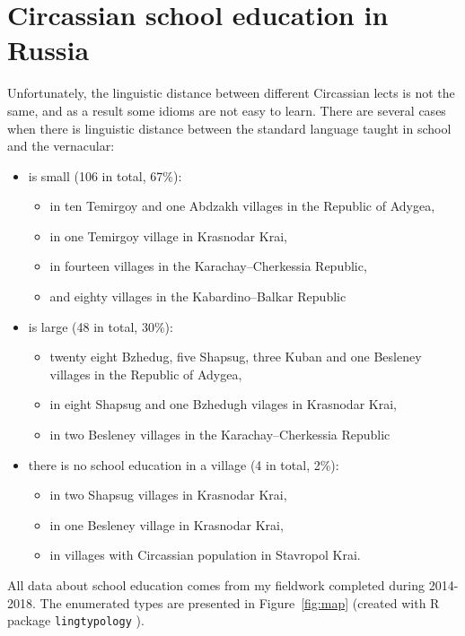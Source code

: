 \section{Circassian school education in Russia}
Unfortunately, the linguistic distance between different Circassian lects is not the same, and as a result some idioms are not easy to learn. There are several cases when there is linguistic distance between the standard language taught in school and the vernacular:

\begin{itemize}
\item is small (106 in total, 67\%):
\begin{itemize}
\item in ten Temirgoy and one Abdzakh villages in the Republic of Adygea,
\item in one Temirgoy village in Krasnodar Krai,
\item in fourteen villages in the Karachay--Cherkessia Republic,
\item   and eighty villages in the Kabardino--Balkar Republic
\end{itemize}
\item is large (48 in total, 30\%): 
\begin{itemize}
\item twenty eight Bzhedug, five Shapsug, three Kuban and one Besleney villages in the Republic of Adygea,
\item in eight Shapsug and one Bzhedugh vilages in Krasnodar Krai,
\item in two Besleney villages in the Karachay--Cherkessia Republic
\end{itemize}   
\item there is no school education in a village (4 in total, 2\%):
\begin{itemize}
\item in two Shapsug villages in Krasnodar Krai,
\item in one Besleney village in Krasnodar Krai,
\item in villages with Circassian population in Stavropol Krai.
\end{itemize}
\end{itemize}

\par All data about school education comes from my fieldwork completed during 2014-2018. The enumerated types are presented in Figure~\ref{fig:map} (created with R \citep{rcitation19} package \texttt{lingtypology} \citep{moroz17}).

